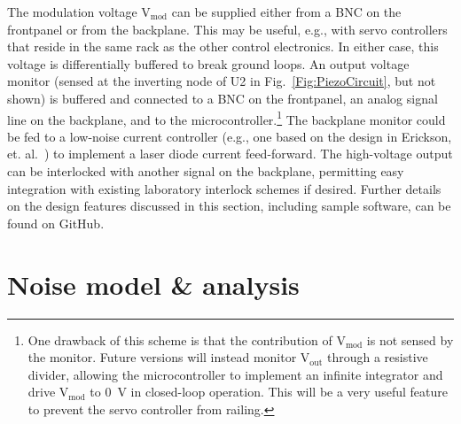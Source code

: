 \documentclass[aip,rsi,reprint]{revtex4-1} %
\begin{document}
The modulation voltage $\text{V}_\text{mod}$ can be supplied either from a BNC on the frontpanel or from the backplane.
This may be useful, e.g., with servo controllers that reside in the same rack as the other control electronics.
In either case, this voltage is differentially buffered to break ground loops.
An output voltage monitor (sensed at the inverting node of U2 in Fig.~\ref{Fig:PiezoCircuit}, but not shown) is buffered and connected to a BNC on the frontpanel, an analog signal line on the backplane, and to the microcontroller.\footnote{One drawback of this scheme is that the contribution of $\text{V}_\text{mod}$ is not sensed by the monitor. Future versions will instead monitor $\text{V}_\text{out}$ through a resistive divider, allowing the microcontroller to implement an infinite integrator and drive $\text{V}_\text{mod}$ to \SI{0}{\volt} in closed-loop operation. This will be a very useful feature to prevent the servo controller from railing.}
The backplane monitor could be fed to a low-noise current controller (e.g., one based on the design in Erickson, et. al.~\cite{Erickson2008a}) to implement a laser diode current feed-forward.
The high-voltage output can be interlocked with another signal on the backplane, permitting easy integration with existing laboratory interlock schemes if desired.
Further details on the design features discussed in this section, including sample software, can be found on GitHub.\cite{PiezoDesignFiles}

\section{Noise model \& analysis}
\label{Sec:NoiseAnalysis}
\end{document}
